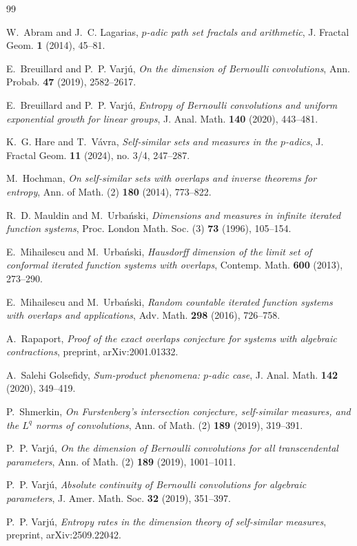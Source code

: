 \documentclass[11pt,reqno]{amsart}
\theoremstyle{plain}
\theoremstyle{definition}
\theoremstyle{remark}
\begin{document}
\begin{thebibliography}{99}

W.~Abram and J.~C. Lagarias,
\emph{$p$-adic path set fractals and arithmetic},
J. Fractal Geom. \textbf{1} (2014), 45--81.

E.~Breuillard and P.~P. Varj\'u,
\emph{On the dimension of Bernoulli convolutions},
Ann. Probab. \textbf{47} (2019), 2582--2617.

E.~Breuillard and P.~P. Varj\'u,
\emph{Entropy of Bernoulli convolutions and uniform exponential growth for
linear groups},
J. Anal. Math. \textbf{140} (2020), 443--481.

K.~G. Hare and T.~V\'avra,
\emph{Self-similar sets and measures in the $p$-adics},
J. Fractal Geom. \textbf{11} (2024), no. 3/4, 247--287.

M.~Hochman,
\emph{On self-similar sets with overlaps and inverse theorems for entropy},
Ann. of Math. (2) \textbf{180} (2014), 773--822.

R.~D. Mauldin and M.~Urba\'nski,
\emph{Dimensions and measures in infinite iterated function systems},
Proc. London Math. Soc. (3) \textbf{73} (1996), 105--154.

E.~Mihailescu and M.~Urba\'nski,
\emph{Hausdorff dimension of the limit set of conformal iterated function
systems with overlaps},
Contemp. Math. \textbf{600} (2013), 273--290.

E.~Mihailescu and M.~Urba\'nski,
\emph{Random countable iterated function systems with overlaps and
applications},
Adv. Math. \textbf{298} (2016), 726--758.

A.~Rapaport,
\emph{Proof of the exact overlaps conjecture for systems with algebraic
contractions},
preprint, arXiv:2001.01332.

A.~Salehi Golsefidy,
\emph{Sum-product phenomena: $p$-adic case},
J. Anal. Math. \textbf{142} (2020), 349--419.

P.~Shmerkin,
\emph{On Furstenberg's intersection conjecture, self-similar measures, and
the $L^q$ norms of convolutions},
Ann. of Math. (2) \textbf{189} (2019), 319--391.

P.~P. Varj\'u,
\emph{On the dimension of Bernoulli convolutions for all transcendental
parameters},
Ann. of Math. (2) \textbf{189} (2019), 1001--1011.

P.~P. Varj\'u,
\emph{Absolute continuity of Bernoulli convolutions for algebraic
parameters},
J. Amer. Math. Soc. \textbf{32} (2019), 351--397.

P.~P. Varj\'u,
\emph{Entropy rates in the dimension theory of self-similar measures},
preprint, arXiv:2509.22042.

\end{thebibliography}
\end{document}
